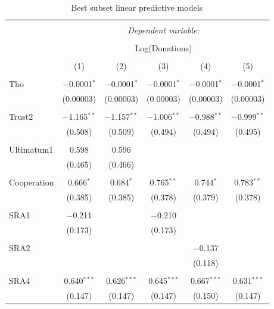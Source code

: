 \newpage

\begin{table}[H] \centering 
  \caption{Best subset linear predictive models} 
  \label{} 
    \begin{adjustbox}{width=\textwidth}
\begin{tabular}{@{\extracolsep{5pt}}lccccc} 
\\[-1.8ex]\hline 
\hline \\[-1.8ex] 
 & \multicolumn{5}{c}{\textit{Dependent variable:}} \\ 
\cline{2-6} 
\\[-1.8ex] & \multicolumn{5}{c}{Log(Donations)} \\ 
\\[-1.8ex] & (1) & (2) & (3) & (4) & (5)\\ 
\hline \\[-1.8ex] 
 Tho & $-$0.0001$^{*}$ & $-$0.0001$^{*}$ & $-$0.0001$^{*}$ & $-$0.0001$^{*}$ & $-$0.0001$^{*}$ \\ 
  & (0.00003) & (0.00003) & (0.00003) & (0.00003) & (0.00003) \\ 
  & & & & & \\ 
 Trust2 & $-$1.165$^{**}$ & $-$1.157$^{**}$ & $-$1.006$^{**}$ & $-$0.988$^{**}$ & $-$0.999$^{**}$ \\ 
  & (0.508) & (0.509) & (0.494) & (0.494) & (0.495) \\ 
  & & & & & \\ 
 Ultimatum1 & 0.598 & 0.596 &  &  &  \\ 
  & (0.465) & (0.466) &  &  &  \\ 
  & & & & & \\ 
 Cooperation & 0.666$^{*}$ & 0.684$^{*}$ & 0.765$^{**}$ & 0.744$^{*}$ & 0.783$^{**}$ \\ 
  & (0.385) & (0.385) & (0.378) & (0.379) & (0.378) \\ 
  & & & & & \\ 
 SRA1 & $-$0.211 &  & $-$0.210 &  &  \\ 
  & (0.173) &  & (0.173) &  &  \\ 
  & & & & & \\ 
 SRA2 &  &  &  & $-$0.137 &  \\ 
  &  &  &  & (0.118) &  \\ 
  & & & & & \\ 
 SRA4 & 0.640$^{***}$ & 0.626$^{***}$ & 0.645$^{***}$ & 0.667$^{***}$ & 0.631$^{***}$ \\ 
  & (0.147) & (0.147) & (0.147) & (0.150) & (0.147) \\ 

\end{tabular}
\end{adjustbox}
\end{table}
